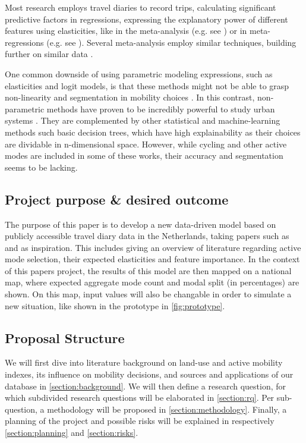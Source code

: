 \documentclass[sigconf, natbib=false, nonacm]{acmart}
\begin{document}
    Most research employs travel diaries to record trips, calculating significant predictive factors in regressions, expressing the explanatory power of different features using elasticities, like in the meta-analysis (e.g. see \cite{ewing_travel_2010}) or in meta-regressions (e.g. see \cite{stevens_does_2017}). Several meta-analysis employ similar techniques, building further on similar data \parencite{naess_meta-analyses_2022}. 
    
    One common downside of using parametric modeling expressions, such as elasticities and logit models, is that these methods might not be able to grasp non-linearity and segmentation in mobility choices \cite{lee_comparison_2018}. In this contrast, non-parametric methods have proven to be incredibly powerful to study urban systems \parencite{lee_comparison_2018}. They are complemented by other statistical and machine-learning methods such basic decision trees, which have high explainability as their choices are dividable in n-dimensional space. However, while cycling and other active modes are included in some of these works, their accuracy and segmentation seems to be lacking. 

    \subsection{Project purpose \& desired outcome}
    The purpose of this paper is to develop a new data-driven model based on publicly accessible travel diary data in the Netherlands, taking papers such as \cite{ding_applying_2018} and \cite{bakri_inzichten_2023} as inspiration. This includes giving an overview of literature regarding active mode selection, their expected elasticities and feature importance. In the context of this papers project, the results of this model are then mapped on a national map, where expected aggregate mode count and modal split (in percentages) are shown. On this map, input values will also be changable in order to simulate a new situation, like shown in the prototype in \autoref{fig:prototype}.
    
    \subsection{Proposal Structure}
    We will first dive into literature background on land-use and active mobility indexes, its influence on mobility decisions, and sources and applications of our database in \autoref{section:background}. We will then define a research question, for which subdivided research questions will be elaborated
    in \autoref{section:rq}. Per sub-question, a methodology will be proposed in
    \autoref{section:methodology}. Finally, a planning of the project and possible risks will
    be explained in respectively \autoref{section:planning} and \autoref{section:risks}.
\end{document}
